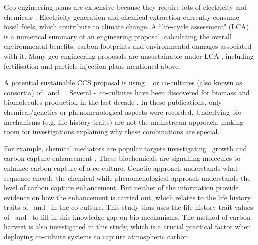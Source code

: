 \documentclass[../thesis.tex]{subfiles} %
\begin{document}
Geo-engineering plans are expensive because they require lots of electricity and chemicals \autocite{boyd2008ranking,boyd2008implications,mcclellan2012cost}.  Electricity generation and chemical extraction currently consume fossil fuels, which contribute to climate change.  A ``life-cycle assessment" (LCA) is a numerical summary of an engineering proposal, calculating the overall environmental benefits, carbon footprints and environmental damages associated with it.  Many geo-engineering proposals are unsustainable under LCA \autocite{abdussalam2020green}, including fertilisation and particle injection plans mentioned above.

A potential sustainable CCS proposal is using \phy\ \autocite{farrelly2013carbon} or co-cultures (also known as consortia) of \phy\ and \bac\ \autocite{fuentes2016impact}.  Several \phy-\bac\ co-cultures have been discovered for biomass and biomolecules production in the last decade \autocite{fuentes2016impact,santos2014microalgal}.  In these publications, only chemical/genetics \autocite{amin2009photolysis,durham2015cryptic,leyva2014accumulation,rivas2010interactions,seyedsayamdost2011roseobacticides} or phenomenological \autocite{choix2012enhanced1,choix2012enhanced2,kazamia2012mutualistic,santos2014microalgal} aspects were recorded.  Underlying bio-mechanisms (e.g. life history traits) are not the mainstream approach, making room for investigations explaining why these combinations are special.

For example, chemical mediators are popular targets investigating \phy\ growth and carbon capture enhancement \autocite{fuentes2016impact}.  These biochemicals are signalling molecules to enhance carbon capture of a co-culture.  Genetic approach understands what sequence encode the chemical while phenomenological approach understands the level of carbon capture enhancement.  But neither of the information provide evidence on how the enhancement is carried out, which relates to the life history traits of \phy\ and \bacm\ in the co-culture.  This study thus uses the life history trait values of \phy\ and \bac\ to fill in this knowledge gap on bio-mechanisms.  The method of carbon harvest is also investigated in this study, which is a crucial practical factor when deploying co-culture systems to capture atmospheric carbon.
\end{document}
